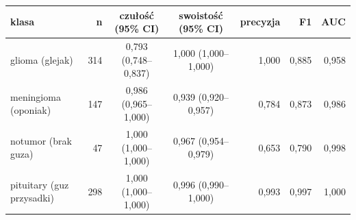 \begin{tabular}{lrccrrr}
\toprule
klasa & n & czułość (95\% CI) & swoistość (95\% CI) & precyzja & F1 & AUC \\
\midrule
glioma (glejak) & 314 & 0,793 (0,748--0,837) & 1,000 (1,000--1,000) & 1,000 & 0,885 & 0,958 \\
meningioma (oponiak) & 147 & 0,986 (0,965--1,000) & 0,939 (0,920--0,957) & 0,784 & 0,873 & 0,986 \\
notumor (brak guza) & 47 & 1,000 (1,000--1,000) & 0,967 (0,954--0,979) & 0,653 & 0,790 & 0,998 \\
pituitary (guz przysadki) & 298 & 1,000 (1,000--1,000) & 0,996 (0,990--1,000) & 0,993 & 0,997 & 1,000 \\
\bottomrule
\end{tabular}

